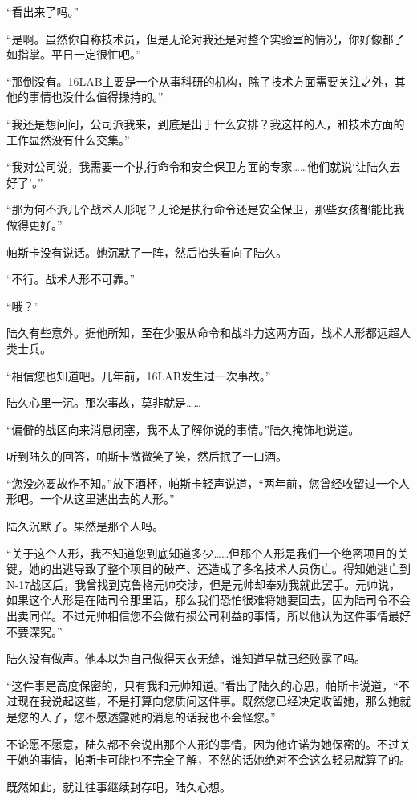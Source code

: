 “看出来了吗。” 

“是啊。虽然你自称技术员，但是无论对我还是对整个实验室的情况，你好像都了如指掌。平日一定很忙吧。”

“那倒没有。16LAB主要是一个从事科研的机构，除了技术方面需要关注之外，其他的事情也没什么值得操持的。”

“我还是想问问，公司派我来，到底是出于什么安排？我这样的人，和技术方面的工作显然没有什么交集。”

“我对公司说，我需要一个执行命令和安全保卫方面的专家……他们就说‘让陆久去好了’。”

“那为何不派几个战术人形呢？无论是执行命令还是安全保卫，那些女孩都能比我做得更好。”

帕斯卡没有说话。她沉默了一阵，然后抬头看向了陆久。

“不行。战术人形不可靠。”

“哦？”

陆久有些意外。据他所知，至在少服从命令和战斗力这两方面，战术人形都远超人类士兵。

“相信您也知道吧。几年前，16LAB发生过一次事故。”

陆久心里一沉。那次事故，莫非就是……

“偏僻的战区向来消息闭塞，我不太了解你说的事情。”陆久掩饰地说道。

听到陆久的回答，帕斯卡微微笑了笑，然后抿了一口酒。

“您没必要故作不知。”放下酒杯，帕斯卡轻声说道，“两年前，您曾经收留过一个人形吧。一个从这里逃出去的人形。”

陆久沉默了。果然是那个人吗。

“关于这个人形，我不知道您到底知道多少……但那个人形是我们一个绝密项目的关键，她的出逃导致了整个项目的破产、还造成了多名技术人员伤亡。得知她逃亡到N-17战区后，我曾找到克鲁格元帅交涉，但是元帅却奉劝我就此罢手。元帅说，如果这个人形是在陆司令那里话，那么我们恐怕很难将她要回去，因为陆司令不会出卖同伴。不过元帅相信您不会做有损公司利益的事情，所以他认为这件事情最好不要深究。”

陆久没有做声。他本以为自己做得天衣无缝，谁知道早就已经败露了吗。

“这件事是高度保密的，只有我和元帅知道。”看出了陆久的心思，帕斯卡说道，“不过现在我说起这些，不是打算向您质问这件事。既然您已经决定收留她，那么她就是您的人了，您不愿透露她的消息的话我也不会怪您。”

不论愿不愿意，陆久都不会说出那个人形的事情，因为他许诺为她保密的。不过关于她的事情，帕斯卡可能也不完全了解，不然的话她绝对不会这么轻易就算了的。

既然如此，就让往事继续封存吧，陆久心想。

